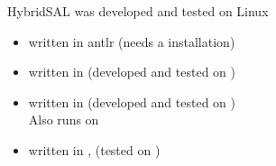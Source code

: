 \documentclass{seminar}
\begin{document}
\begin{slide}

HybridSAL was developed and tested on Linux

\begin{itemize}
\item
 {} written in antlr (needs a {} installation)
\item
 {} written in {}
 (developed and tested on {})
\item
 {} written in {}
 (developed and tested on {})
 \\
 Also runs on {}
\item
 {} written in {, {}}
 (tested on {})
\end{itemize}

\end{slide}
\end{document}
